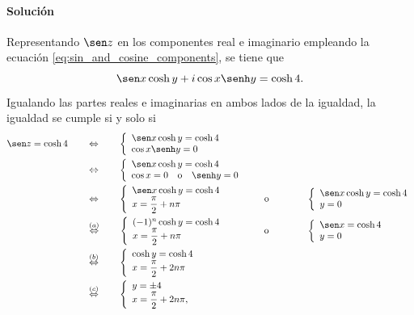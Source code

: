 \documentclass[a4paper]{report}
\begin{document}
\paragraph{Solución} Representando \(\sen z\) en los componentes real e imaginario empleando la ecuación \ref{eq:sin_and_cosine_components}, se tiene que 
\[
 \sen x\cosh y+i\cos x\senh y=\cosh4.
\]
Igualando las partes reales e imaginarias en ambos lados de la igualdad, la igualdad se cumple si y solo si
\begin{align*}
 \sen z=\cosh 4
 \qquad&\Leftrightarrow\qquad
  \left\{ 
  \begin{array}{l}
   \sen x\cosh y=\cosh4\\
   \cos x\senh y=0
  \end{array}\right.\\
 \qquad&\Leftrightarrow\qquad
  \left\{ 
  \begin{array}{l}
   \sen x\cosh y=\cosh4\\
   \cos x=0\quad\textrm{o}\quad\senh y=0
  \end{array}\right.\\
  \qquad&\Leftrightarrow\qquad
  \left\{ 
  \begin{array}{l}
   \sen x\cosh y=\cosh4\\
   x=\dfrac{\pi}{2}+n\pi
  \end{array}\right.
  \qquad\qquad\textrm{o}\qquad\qquad
  \left\{ 
  \begin{array}{l}
   \sen x\cosh y=\cosh4\\
   y=0
  \end{array}\right.\\
  \qquad&\overset{(a)}{\Leftrightarrow}\qquad
  \left\{ 
  \begin{array}{l}
   (-1)^n\cosh y=\cosh4\\
   x=\dfrac{\pi}{2}+n\pi
  \end{array}\right.
  \qquad\qquad\textrm{o}\qquad\qquad
  \left\{ 
  \begin{array}{l}
   \sen x=\cosh4\\
   y=0
  \end{array}\right.\\
  \qquad&\overset{(b)}{\Leftrightarrow}\qquad
  \left\{ 
  \begin{array}{l}
   \cosh y=\cosh4\\
   x=\dfrac{\pi}{2}+2n\pi
  \end{array}\right.\\
  \qquad&\overset{(c)}{\Leftrightarrow}\qquad
  \left\{ 
  \begin{array}{l}
   y=\pm4\\
   x=\dfrac{\pi}{2}+2n\pi,
  \end{array}\right.
\end{align*}
\end{document}
